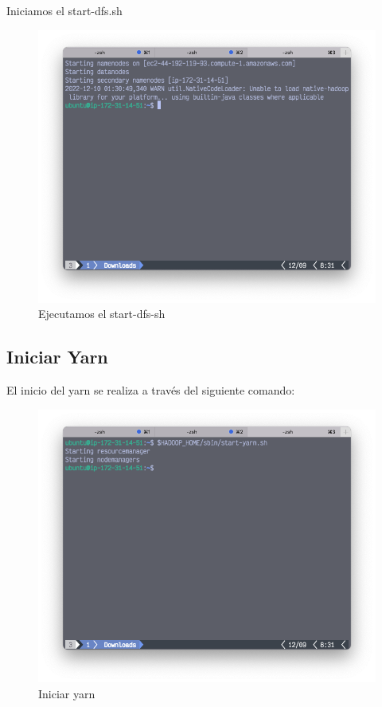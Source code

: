 \clearpage
Iniciamos el start-dfs.sh
\begin{figure}[h]
	\centering
	\includegraphics[scale=.35] {img/42-start-dfs-sh}
	\caption{Ejecutamos el start-dfs-sh}
	\label{fig:42}	
\end{figure}

\clearpage


\subsection{Iniciar Yarn}
El inicio del yarn se realiza a través del siguiente comando:
\begin{figure}[h]
	\centering
	\includegraphics[scale=.35] {img/43-start-yarn-sh}
	\caption{Iniciar yarn}
	\label{fig:43}
\end{figure}

